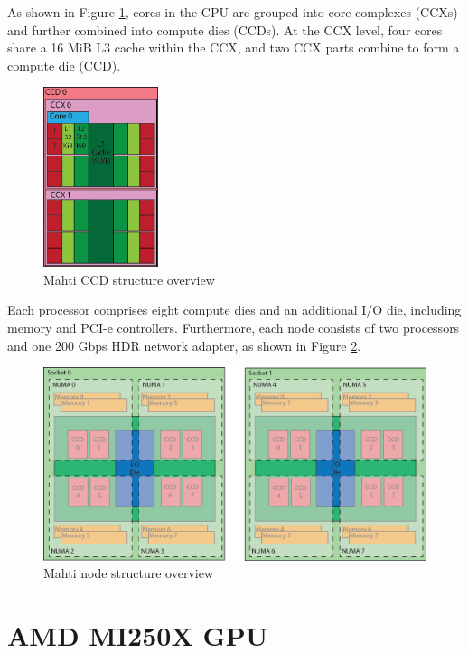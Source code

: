 As shown in Figure \ref{fig_mahti_ccd}, cores in the CPU are grouped into core complexes (CCXs) and further combined into compute dies (CCDs). At the CCX level, four cores share a 16 MiB L3 cache within the CCX, and two CCX parts combine to form a compute die (CCD).

\begin{figure}[H]
    \centering
    \includegraphics[width=0.3\textwidth]{figures/mahti_ccd.png}
    \caption{Mahti CCD structure overview \cite{mahti}}
    \label{fig_mahti_ccd}
\end{figure}

Each processor comprises eight compute dies and an additional I/O die, including memory and PCI-e controllers. Furthermore, each node consists of two processors and one 200 Gbps HDR network adapter, as shown in Figure \ref{fig_mahti_node}.

\begin{figure}[H]
    \centering
    \includegraphics[width=1.1\textwidth]{figures/mahti_node.png}
    \caption{Mahti node structure overview \cite{mahti}}
    \label{fig_mahti_node}
\end{figure}

\section{AMD MI250X GPU}

